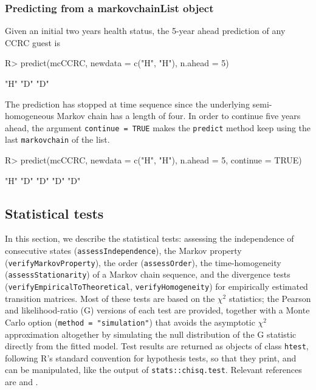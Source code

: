 \documentclass[
  nojss]{jss}
\begin{document}
\subsubsection{Predicting from a markovchainList object}\label{predicting-from-a-markovchainlist-object}

Given an initial two years health status, the 5-year ahead prediction of any CCRC guest is

\begin{CodeChunk}
\begin{CodeInput}
R> predict(mcCCRC, newdata = c("H", "H"), n.ahead = 5)
\end{CodeInput}
\begin{CodeOutput}
[1] "H" "D" "D"
\end{CodeOutput}
\end{CodeChunk}

The prediction has stopped at time sequence since the underlying semi-homogeneous Markov chain has a length of four. In order to continue five years ahead, the argument \texttt{continue\ =\ TRUE} makes the \texttt{predict} method keep using the last \texttt{markovchain} of the list.

\begin{CodeChunk}
\begin{CodeInput}
R> predict(mcCCRC, newdata = c("H", "H"), n.ahead = 5, continue = TRUE)
\end{CodeInput}
\begin{CodeOutput}
[1] "H" "D" "D" "D" "D"
\end{CodeOutput}
\end{CodeChunk}

\subsection{Statistical tests}\label{statistical-tests}

In this section, we describe the statistical tests: assessing the independence of consecutive states (\texttt{assessIndependence}), the Markov property (\texttt{verifyMarkovProperty}), the order (\texttt{assessOrder}), the time-homogeneity (\texttt{assessStationarity}) of a Markov chain sequence, and the divergence tests (\texttt{verifyEmpiricalToTheoretical}, \texttt{verifyHomogeneity}) for empirically estimated transition matrices. Most of these tests are based on the \(\chi ^2\) statistics; the Pearson and likelihood-ratio (G) versions of each test are provided, together with a Monte Carlo option (\texttt{method\ =\ "simulation"}) that avoids the asymptotic \(\chi^2\) approximation altogether by simulating the null distribution of the G statistic directly from the fitted model. Test results are returned as objects of class \texttt{htest}, following R's standard convention for hypothesis tests, so that they print, and can be manipulated, like the output of \texttt{stats::chisq.test}. Relevant references are \cite{kullback1962tests} and \cite{anderson1957statistical}.
\end{document}
